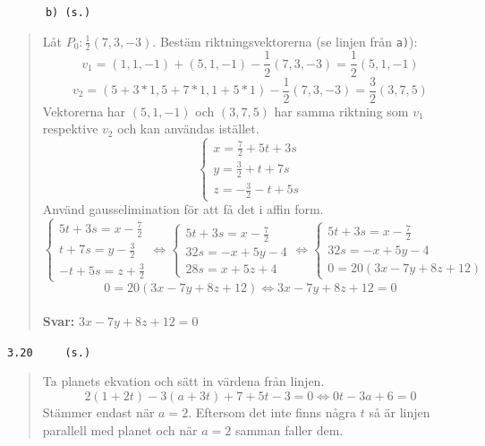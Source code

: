 \documentclass[a4paper]{article}
\newcommand{\tskcol}[1]{\textcolor{tskcol}{#1}}
\begin{document}
\pagebreak
\texttt{\tskcol{~~~~~~b) (s.)}}
\begin{quotation}
	\noindent
	Låt $P_0:\frac{1}{2}(7,3,-3)$. Bestäm riktningsvektorerna (se linjen från \texttt{\tskcol{a)}}):
	\[v_1=(1,1,-1)+(5,1,-1)-\frac{1}{2}(7,3,-3)=\frac{1}{2}(5,1,-1)\]
	\[v_2=(5+3*1,5+7*1,1+5*1)-\frac{1}{2}(7,3,-3)=\frac{3}{2}(3,7,5)\]
	Vektorerna har $(5,1,-1)$ och $(3,7,5)$ har samma riktning som $v_1$ respektive $v_2$ och kan användas istället.
	\[\begin{cases}
	x=\frac{7}{2}+5t+3s \\
	y=\frac{3}{2}+t+7s \\
	z=-\frac{3}{2}-t+5s
	\end{cases}\]
	Använd gausselimination för att få det i affin form.
	\[\begin{cases}
	5t+3s=x-\frac{7}{2} \\
	t+7s=y-\frac{3}{2} \\
	-t+5s=z+\frac{3}{2}
	\end{cases} \Leftrightarrow
	\begin{cases}
	5t+3s=x-\frac{7}{2} \\
	32s=-x+5y-4 \\
	28s=x+5z+4
	\end{cases} \Leftrightarrow
	\begin{cases}
	5t+3s=x-\frac{7}{2} \\
	32s=-x+5y-4 \\
	0=20(3x-7y+8z+12)
	\end{cases}\]
	\[0=20(3x-7y+8z+12)\Leftrightarrow
	3x-7y+8z+12=0\]
	\\
	\textbf{Svar:} $3x-7y+8z+12=0$
\end{quotation}

\texttt{\tskcol{3.20~~~~ (s.)}}
\begin{quotation}
	\noindent
	Ta planets ekvation och sätt in värdena från linjen.
	\[2(1+2t)-3(a+3t)+7+5t-3=0 \Leftrightarrow
	0t-3a+6=0\]
	Stämmer endast när $a=2$. 
	Eftersom det inte finns några $t$ så är linjen parallell med planet och när $a=2$ samman faller dem.
\end{quotation}
\end{document}
